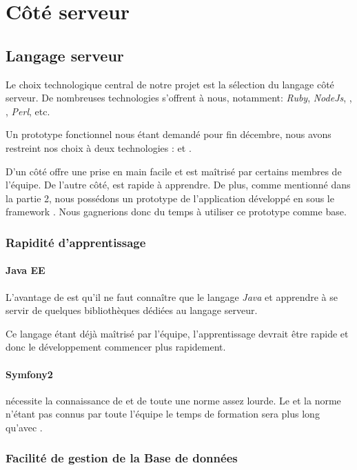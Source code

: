 \section{Côté serveur}

\subsection{Langage serveur}
Le choix technologique central de notre projet est la sélection du langage côté serveur. De nombreuses technologies s'offrent à nous, notamment: \textit{Ruby}, \textit{NodeJs}, \jee, \php, \textit{Perl}, etc.

Un prototype fonctionnel nous étant demandé pour fin décembre, nous avons restreint nos choix à deux technologies : \jee et \php.
 
D'un côté \jee offre une prise en main facile et est maîtrisé par certains membres de l'équipe. De l'autre côté, \php est rapide à apprendre. De plus, comme mentionné dans la partie 2, nous possédons un prototype de l'application développé en \php sous le framework \symfony. Nous gagnerions  donc du temps à utiliser ce prototype comme base. 

\medbreak


\subsubsection{Rapidité d'apprentissage}
\paragraph{Java EE}
L'avantage de \jee est qu'il ne faut connaître que le langage \textit{Java} et apprendre à se servir de quelques bibliothèques dédiées au langage serveur.

Ce langage étant déjà maîtrisé  par  l'équipe, l'apprentissage devrait être rapide et donc le développement commencer plus rapidement.

\paragraph{Symfony2}
\symfony nécessite la connaissance de \php et de toute une norme assez lourde. 
Le \php et la norme n'étant pas connus par toute l'équipe le temps de formation sera plus long qu'avec \jee.

\subsubsection{Facilité de gestion de la Base de données}
